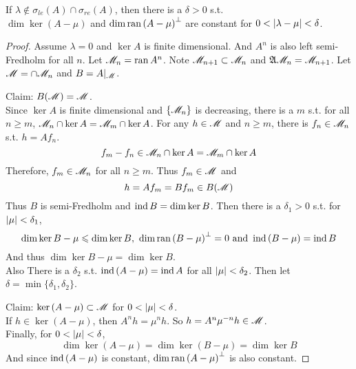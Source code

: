 \begin{thm}
	If $\lambda \notin \sigma_{le}(A) \cap \sigma_{re}(A)$, then there is a $\delta > 0$ s.t. \\ $\dim{\ker{(A - \mu)}}$ and $\dim{\operatorname{ran}{(A - \mu)}^{\bot}}$ are constant for $0< \left\lvert\lambda - \mu\right\lvert < \delta$.
\end{thm}
\begin{proof}
	Assume $\lambda = 0$ and $\ker{A}$ is finite dimensional. And $A^n$ is also left semi-Fredholm for all $n$. Let $\mathscr{M}_n = \operatorname{ran}{A^n}$. Note $\mathscr{M}_{n+1} \subset \mathscr{M}_n$ and $\mathfrak{A} \mathscr{M}_{n} = \mathscr{M}_{n+1}$. Let $\mathscr{M} = \cap \mathscr{M}_n$ and $B = A|_{\mathscr{M}}$.
	\item Claim: $B(\mathscr{M}) = \mathscr{M}$.\\
	Since $\ker{A}$ is finite dimensional and $\{\mathscr{M}_n\}$ is decreasing, there is a $m$ s.t. for all $n \geqslant m$, $\mathscr{M}_n \cap \ker{A} = \mathscr{M}_m \cap \ker{A}$. For any $h \in \mathscr{M}$ and $n \geqslant m$, there is $f_n \in \mathscr{M}_n$ s.t. $h = Af_n$. 
	\begin{equation*}
		f_m - f_n \in \mathscr{M}_n \cap \ker{A} = \mathscr{M}_m \cap \ker{A}
	\end{equation*}
	Therefore, $f_m \in \mathscr{M}_n$ for all $n \geqslant m$. Thus $f_m \in \mathscr{M}$ and
	\begin{equation*}
		h = Af_m = Bf_m \in B(\mathscr{M})
	\end{equation*}
	Thus $B$ is semi-Fredholm and $\operatorname{ind}{B} = \dim{\ker{B}}$. Then there is a $\delta_1 > 0$ s.t. for $\left\lvert\mu\right\lvert < \delta_1$,
	\begin{equation*}
		\dim{\ker{B-\mu}} \leqslant \dim{\ker{B}},~ \dim{\operatorname{ran}{(B-\mu)}^{\bot}} = 0 \text{ and } \operatorname{ind}{(B-\mu)} = \operatorname{ind}{B}
	\end{equation*}
	And thus $\dim{\ker{B-\mu}} = \dim{\ker{B}}$. \\
	Also There is a $\delta_2$ s.t. $\operatorname{ind}{(A-\mu)} = \operatorname{ind}{A}$ for all $\left\lvert\mu\right\lvert < \delta_2$. Then let $\delta = \min{\{\delta_1,\delta_2\}}$.
	\item Claim: $\ker{(A-\mu)} \subset \mathscr{M}$ for $0 < \left\lvert\mu\right\lvert < \delta$. \\
	If $h \in \ker{(A-\mu)}$, then $A^n h = \mu^n h$. So $h = A^n \mu^{-n} h \in \mathscr{M}$.\\
	Finally, for $0 < \left\lvert\mu\right\lvert < \delta$,
	\begin{equation*}
		\dim{\ker{(A-\mu)}} = \dim{\ker{(B-\mu)}} = \dim{\ker{B}}
	\end{equation*}
	And since $\operatorname{ind}{(A-\mu)}$ is constant, $\dim{\operatorname{ran}{(A - \mu)}^{\bot}}$ is also constant.
\end{proof}

